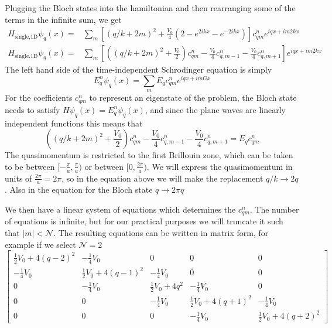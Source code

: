 \documentclass[oneside,11pt]{memoir}
\newcommand{\vo}{\ensuremath{V_{0}}}
\begin{document}
Plugging the Bloch states into the hamiltonian and then rearranging some of the
terms in the infinite sum, we get \begin{equation}
\begin{split}
  H_{\text{single,1D}} \psi_{q}(x) = &  
      \sum_{m} \left[(q/k+2m)^{2} 
      + \frac{\vo}{4}(2-e^{2ikx}-e^{-2ikx}) \right]
      c_{qm}^{n} e^{iqx+im2kx} \\ 
  H_{\text{single,1D}} \psi_{q}(x) = &  
      \sum_{m} \left[ \left(  (q/k+2m)^{2} 
      + \frac{\vo}{2} \right) c_{qm}^{n} 
      - \frac{\vo}{4}c_{q,m-1}^{n} - \frac{\vo}{4}c_{q,m+1}^{n} \right] 
      e^{iqx+im2kx} 
\end{split}
\end{equation}
The left hand side of the time-independent Schrodinger equation is simply 
\begin{equation}
  E_{q}^{n}\psi_{q}(x) = \sum_{m} E_{q} c_{qm}^{n} e^{iqx+imGx}
\end{equation}
For the coefficients $c_{qm}^{n}$ to represent an eigenstate of the problem, the
Bloch state needs to satisfy $H\psi_{q}(x) = E_{q}^{n}\psi_{q}(x)$, and since the
plane waves are linearly independent functions this means that 
\begin{equation}
  \left(  (q/k+2m)^{2} + \frac{\vo}{2} \right) c_{qm}^{n}
  - \frac{\vo}{4}c_{q,m-1}^{n} - \frac{\vo}{4}c_{q,m+1}^{n} = E_{q} c_{qm}^{n} 
\end{equation}
The quasimomentum is restricted to the first Brillouin zone, which can be taken
to be between $[-\frac{\pi}{a}, \frac{\pi}{a})$ or  between $[0,\frac{2\pi}{a})$.  
We will express the quasimomentum in units of $\frac{2\pi}{a}=2\pi$, so in the
equation above we will make the replacement $q/k \rightarrow 2q$.  Also in the
equation for the Bloch state $q \rightarrow 2\pi q$ 
 
We then have a linear system of equations which determines the $c_{qm}^{n}$.
The number of equations is infinite, but for our practical purposes we will
truncate it such that $|m|<\mathcal{N}$.  The resulting equations can be
written in matrix form, for example if we select
$\mathcal{N}=2$ 
\begin{equation}
\left[\begin{smallmatrix}\frac{1}{2} V_{{0}} + 4 \left(q -2\right)^{2} & - \frac{1}{4} V_{{0}} & 0 & 0 & 0\\- \frac{1}{4} V_{{0}} & \frac{1}{2} V_{{0}} + 4 \left(q -1\right)^{2} & - \frac{1}{4} V_{{0}} & 0 & 0\\0 & - \frac{1}{4} V_{{0}} & \frac{1}{2} V_{{0}} + 4 q^{2} & - \frac{1}{4} V_{{0}} & 0\\0 & 0 & - \frac{1}{4} V_{{0}} & \frac{1}{2} V_{{0}} + 4 \left(q + 1\right)^{2} & - \frac{1}{4} V_{{0}}\\0 & 0 & 0 & - \frac{1}{4} V_{{0}} & \frac{1}{2} V_{{0}} + 4 \left(q + 2\right)^{2}\end{smallmatrix}\right]
\end{equation}
\end{document}
